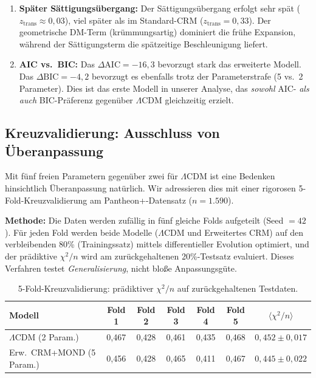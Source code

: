 \documentclass[aps,prd,twocolumn,superscriptaddress,nofootinbib]{revtex4-2}
\begin{document}
\begin{enumerate}
\item \textbf{Sp\"ater S\"attigungs\"ubergang:} Der S\"attigungs\"ubergang erfolgt sehr sp\"at ($z_{\mathrm{trans}} \approx 0{,}03$), viel sp\"ater als im Standard-CRM ($z_{\mathrm{trans}} = 0{,}33$). Der geometrische DM-Term (kr\"ummungsartig) dominiert die fr\"uhe Expansion, w\"ahrend der S\"attigungsterm die sp\"atzeitige Beschleunigung liefert.

\item \textbf{AIC vs.\ BIC:} Das $\Delta\mathrm{AIC} = -16{,}3$ bevorzugt stark das erweiterte Modell. Das $\Delta\mathrm{BIC} = -4{,}2$ bevorzugt es ebenfalls trotz der Parameterstrafe (5 vs.\ 2 Parameter). Dies ist das erste Modell in unserer Analyse, das \textit{sowohl} AIC- \textit{als auch} BIC-Pr\"aferenz gegen\"uber $\Lambda$CDM gleichzeitig erzielt.
\end{enumerate}

\subsection{Kreuzvalidierung: Ausschluss von \"Uberanpassung}
\label{subsec:crossval}

Mit f\"unf freien Parametern gegen\"uber zwei f\"ur $\Lambda$CDM ist eine Bedenken hinsichtlich \"Uberanpassung nat\"urlich. Wir adressieren dies mit einer rigorosen 5-Fold-Kreuzvalidierung am Pantheon+-Datensatz ($n = 1.590$).

\textbf{Methode:} Die Daten werden zuf\"allig in f\"unf gleiche Folds aufgeteilt (Seed $= 42$). F\"ur jeden Fold werden beide Modelle ($\Lambda$CDM und Erweitertes CRM) auf den verbleibenden 80\% (Trainingssatz) mittels differentieller Evolution optimiert, und der pr\"adiktive $\chi^2/n$ wird am zur\"uckgehaltenen 20\%-Testsatz evaluiert. Dieses Verfahren testet \textit{Generalisierung}, nicht blo\ss{}e Anpassungsg\"ute.

\begin{table}
\centering
\caption{5-Fold-Kreuzvalidierung: pr\"adiktiver $\chi^2/n$ auf zur\"uckgehaltenen Testdaten.}
\label{tab:crossval}
\begin{tabular}{lcccccc}
\toprule
\textbf{Modell} & \textbf{Fold 1} & \textbf{Fold 2} & \textbf{Fold 3} & \textbf{Fold 4} & \textbf{Fold 5} & $\langle\chi^2/n\rangle$ \\
\midrule
$\Lambda$CDM (2 Param.) & 0,467 & 0,428 & 0,461 & 0,435 & 0,468 & $0{,}452 \pm 0{,}017$ \\
Erw.\ CRM+MOND (5 Param.) & 0,456 & 0,428 & 0,465 & 0,411 & 0,467 & $0{,}445 \pm 0{,}022$ \\
\bottomrule
\end{tabular}
\end{table}
\end{document}
